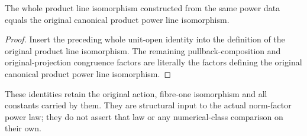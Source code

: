 \begin{lemma}
\label{lem:native-tc-nef-fs-product-power-coherence}
\leanok
{}
The whole product line isomorphism constructed from the same power data
equals the original canonical product power line isomorphism.
\end{lemma}
\begin{proof}
Insert the preceding whole unit-open identity into the definition of
the original product line isomorphism.  The remaining pullback-composition
and original-projection congruence factors are literally the factors
defining the original canonical product power line isomorphism.
\end{proof}

\begin{remark}
These identities retain the original action, fibre-one isomorphism and
all constants carried by them.  They are structural input to the actual
norm-factor power law; they do not assert that law or any numerical-class
comparison on their own.
\end{remark}
